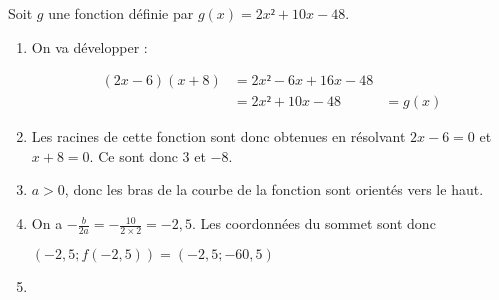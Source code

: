 \documentclass[
	classe=$1^{ere}STI2D$,
	headerTitle=Évaluation\space Chapitre\space 4
]{évaluation}
\begin{document}
\begin{exercice}
	Soit $g$ une fonction définie par $g(x) = 2x² + 10x - 48$.
	\begin{enumerate}
		\item On va développer :

		      \begin{align*}
			      (2x - 6)(x + 8) & = 2x² - 6x + 16x - 48 \\
			                      & = 2x² + 10x - 48
			                      & = g(x)
		      \end{align*}
		\item Les racines de cette fonction sont donc obtenues en résolvant $2x - 6 = 0$ et $x + 8 = 0$. Ce sont donc $3$ et $-8$.
		\item $a > 0$, donc les bras de la courbe de la fonction sont orientés vers le haut.
		\item On a $-\frac{b}{2a} = -\frac{10}{2×2} = -2,5$. Les coordonnées du sommet sont donc
		
		$(-2,5 ; f(-2,5)) = (-2,5 ; -60,5)$
		\item {}
	\end{enumerate}
\end{exercice}
\end{document}
